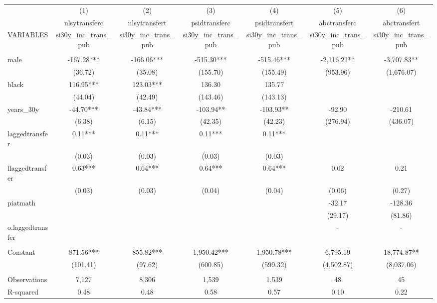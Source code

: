 \begin{tabular}{lcccccc} \hline
 & (1) & (2) & (3) & (4) & (5) & (6) \\
 & nlsytransferc & nlsytransfert & psidtransferc & psidtransfert & abctransferc & abctransfert \\
VARIABLES & si30y\_inc\_trans\_pub & si30y\_inc\_trans\_pub & si30y\_inc\_trans\_pub & si30y\_inc\_trans\_pub & si30y\_inc\_trans\_pub & si30y\_inc\_trans\_pub \\ \hline
 &  &  &  &  &  &  \\
male & -167.28*** & -166.06*** & -515.30*** & -515.46*** & -2,116.21** & -3,707.83** \\
 & (36.72) & (35.08) & (155.70) & (155.49) & (953.96) & (1,676.07) \\
black & 116.95*** & 123.03*** & 136.30 & 135.77 &  &  \\
 & (44.04) & (42.49) & (143.46) & (143.13) &  &  \\
years\_30y & -44.70*** & -43.84*** & -103.94** & -103.93** & -92.90 & -210.61 \\
 & (6.38) & (6.15) & (42.35) & (42.23) & (276.94) & (436.07) \\
laggedtransfer & 0.11*** & 0.11*** & 0.11*** & 0.11*** &  &  \\
 & (0.03) & (0.03) & (0.03) & (0.03) &  &  \\
llaggedtransfer & 0.63*** & 0.64*** & 0.64*** & 0.64*** & 0.02 & 0.21 \\
 & (0.03) & (0.03) & (0.04) & (0.04) & (0.06) & (0.27) \\
piatmath &  &  &  &  & -32.17 & -128.36 \\
 &  &  &  &  & (29.17) & (81.86) \\
o.laggedtransfer &  &  &  &  & - & - \\
 &  &  &  &  &  &  \\
Constant & 871.56*** & 855.82*** & 1,950.42*** & 1,950.78*** & 6,795.19 & 18,774.87** \\
 & (101.41) & (97.62) & (600.85) & (599.32) & (4,502.87) & (8,037.06) \\
 &  &  &  &  &  &  \\
Observations & 7,127 & 8,306 & 1,539 & 1,539 & 48 & 45 \\
 R-squared & 0.48 & 0.48 & 0.58 & 0.57 & 0.10 & 0.22 \\ \hline
\end{tabular}
